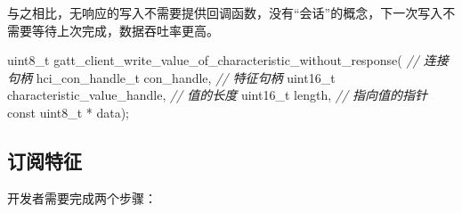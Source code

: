 \documentclass[
  12pt,
]{book}
\newenvironment{Shaded}{\begin{snugshade}}{\end{snugshade}}
\newcommand{\CommentTok}[1]{\textcolor[rgb]{0.56,0.35,0.01}{\textit{#1}}}
\newcommand{\DataTypeTok}[1]{\textcolor[rgb]{0.13,0.29,0.53}{#1}}
\newcommand{\NormalTok}[1]{#1}
\begin{document}
与之相比，无响应的写入不需要提供回调函数，没有``会话''的概念，下一次写入不需要等待上次完成，数据吞吐率更高。

\begin{Shaded}
\begin{Highlighting}[]
\DataTypeTok{uint8_t}\NormalTok{ gatt_client_write_value_of_characteristic_without_response(}
    \CommentTok{// 连接句柄}
\NormalTok{    hci_con_handle_t con_handle,}
    \CommentTok{// 特征句柄}
    \DataTypeTok{uint16_t}\NormalTok{ characteristic_value_handle,}
    \CommentTok{// 值的长度}
    \DataTypeTok{uint16_t}\NormalTok{ length,}
    \CommentTok{// 指向值的指针}
    \DataTypeTok{const} \DataTypeTok{uint8_t}\NormalTok{ * data);}
\end{Highlighting}
\end{Shaded}

\hypertarget{ux8ba2ux9605ux7279ux5f81}{%
\subsection{订阅特征}\label{ux8ba2ux9605ux7279ux5f81}}

开发者需要完成两个步骤：
\end{document}
